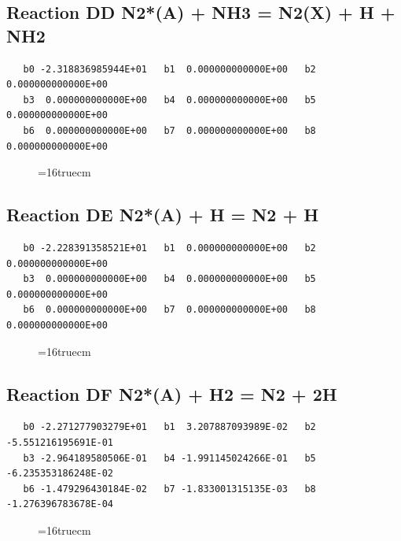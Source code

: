 \documentclass[12pt,dvipdfm]{article}
\begin{document}
\subsection{
Reaction DD N2*(A) + NH3 = N2(X) + H + NH2 }
\begin{small}\begin{verbatim}
   b0 -2.318836985944E+01   b1  0.000000000000E+00   b2  0.000000000000E+00
   b3  0.000000000000E+00   b4  0.000000000000E+00   b5  0.000000000000E+00
   b6  0.000000000000E+00   b7  0.000000000000E+00   b8  0.000000000000E+00
\end{verbatim}\end{small}
\begin{figure}[h!] \label{n2rates}
\epsfxsize=16truecm
\end{figure}
\newpage

\subsection{
Reaction DE N2*(A) + H = N2 + H }
\begin{small}\begin{verbatim}
   b0 -2.228391358521E+01   b1  0.000000000000E+00   b2  0.000000000000E+00
   b3  0.000000000000E+00   b4  0.000000000000E+00   b5  0.000000000000E+00
   b6  0.000000000000E+00   b7  0.000000000000E+00   b8  0.000000000000E+00
\end{verbatim}\end{small}
\begin{figure}[h!] \label{n2rates}
\epsfxsize=16truecm
\end{figure}
\newpage

\subsection{
Reaction DF N2*(A) + H2 = N2 + 2H }
\begin{small}\begin{verbatim}
   b0 -2.271277903279E+01   b1  3.207887093989E-02   b2 -5.551216195691E-01
   b3 -2.964189580506E-01   b4 -1.991145024266E-01   b5 -6.235353186248E-02
   b6 -1.479296430184E-02   b7 -1.833001315135E-03   b8 -1.276396783678E-04
\end{verbatim}\end{small}
\begin{figure}[h!] \label{n2rates}
\epsfxsize=16truecm
\end{figure}
\newpage
\end{document}
